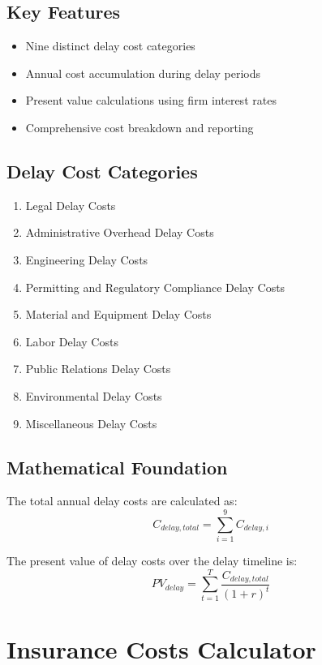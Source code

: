 \documentclass[12pt]{article}
\begin{document}
\subsection{Key Features}
\begin{itemize}
    \item Nine distinct delay cost categories
    \item Annual cost accumulation during delay periods
    \item Present value calculations using firm interest rates
    \item Comprehensive cost breakdown and reporting
\end{itemize}

\subsection{Delay Cost Categories}
\begin{enumerate}
    \item Legal Delay Costs
    \item Administrative Overhead Delay Costs
    \item Engineering Delay Costs
    \item Permitting and Regulatory Compliance Delay Costs
    \item Material and Equipment Delay Costs
    \item Labor Delay Costs
    \item Public Relations Delay Costs
    \item Environmental Delay Costs
    \item Miscellaneous Delay Costs
\end{enumerate}

\subsection{Mathematical Foundation}
The total annual delay costs are calculated as:
\begin{equation}
C_{delay,total} = \sum_{i=1}^{9} C_{delay,i}
\end{equation}

The present value of delay costs over the delay timeline is:
\begin{equation}
PV_{delay} = \sum_{t=1}^{T} \frac{C_{delay,total}}{(1 + r)^t}
\end{equation}

\section{Insurance Costs Calculator}
\end{document}
